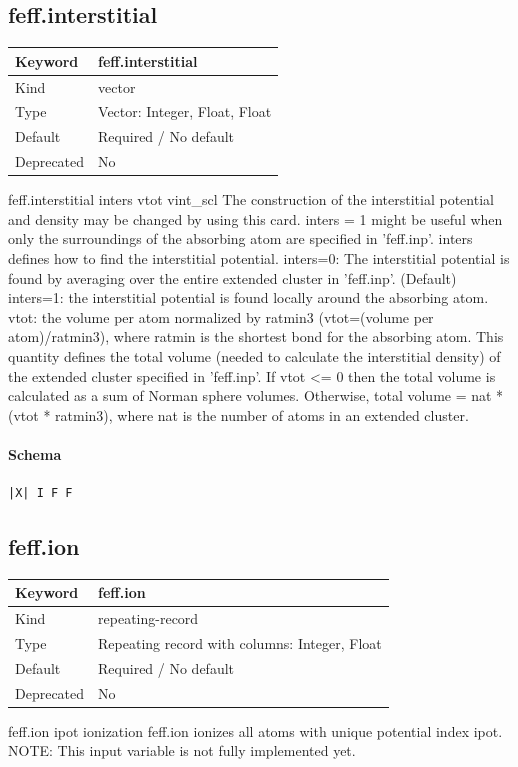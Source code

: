 \documentclass[11pt]{article}
\begin{document}
{{{\subsection{feff.interstitial}
\label{kw:feff-interstitial}
\begin{longtable}{|p{1.5in}|p{4.5in}|}
\hline
Keyword & feff.interstitial \\
\hline
Kind & vector \\
\hline
Type & Vector: Integer, Float, Float \\
\hline
Default & Required / No default \\
\hline
Deprecated & No \\
\hline
\end{longtable}
 feff.interstitial{ inters vtot vint\_scl }
 The construction of the interstitial potential and density may be changed by
 using this card. inters = 1 might be useful when only the surroundings of the
 absorbing atom are specified in 'feff.inp'. inters defines how to find the
 interstitial potential.
    inters=0: The interstitial potential is found by averaging over the
              entire extended cluster in 'feff.inp'. (Default)
    inters=1: the interstitial potential is found locally around the
              absorbing atom.
    vtot:     the volume per atom normalized by ratmin3
              (vtot=(volume per atom)/ratmin3), where ratmin is the shortest
              bond for the absorbing atom. This quantity defines the total
              volume (needed to calculate the interstitial density) of the
              extended cluster specified in 'feff.inp'. If vtot <= 0 then the
              total volume is calculated as a sum of Norman sphere volumes.
              Otherwise, total volume = nat * (vtot * ratmin3), where nat is
              the number of atoms in an extended cluster.

\paragraph{Schema}
\begin{Verbatim}
|X| I F F
\end{Verbatim}

\subsection{feff.ion}
\label{kw:feff-ion}
\begin{longtable}{|p{1.5in}|p{4.5in}|}
\hline
Keyword & feff.ion \\
\hline
Kind & repeating-record \\
\hline
Type & Repeating record with columns: Integer, Float \\
\hline
Default & Required / No default \\
\hline
Deprecated & No \\
\hline
\end{longtable}
 feff.ion{ ipot ionization }
 feff.ion ionizes all atoms with unique potential index ipot.
 NOTE: This input variable is not fully implemented yet.

}}}
\end{document}
